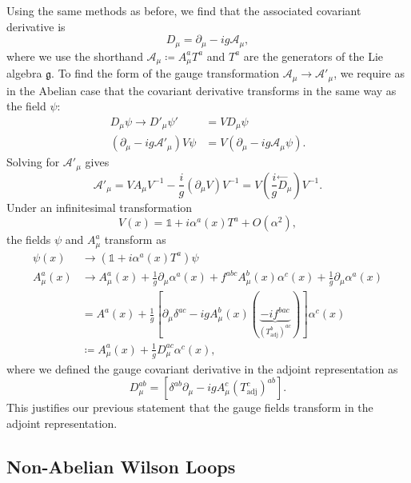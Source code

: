Using the same methods as before, we find that the associated covariant derivative is
\begin{equation}
  D_{\mu} = \partial_{\mu} - i g \mathcal{A}_{\mu},
\end{equation}
where we use the shorthand $\mathcal{A}_{\mu} \coloneqq A_{\mu}^{a} T^{a}$ and $T^{a}$ are the generators of the Lie algebra $\mathfrak{g}$.
To find the form of the gauge transformation $\mathcal{A}_{\mu} \to \mathcal{A}'_{\mu}$, we require as in the Abelian case that the covariant derivative transforms in the same way as the field $\psi$:
\begin{align}
  D_{\mu}\psi \to D'_{\mu} \psi' &= V D_{\mu} \psi \\
  (\partial_{\mu} - i g \mathcal{A}'_{\mu}) V\psi &= V(\partial_{\mu} - i g \mathcal{A}_{\mu} \psi).
\end{align}
Solving for $\mathcal{A}'_{\mu}$ gives
\begin{equation}
  \mathcal{A}'_{\mu} = V A_{\mu} V^{-1} - \frac{i}{g} (\partial_{\mu} V) V^{-1} = V \left(\frac{i}{g} \stackrel{\leftarrow}{D}_{\mu}\right) V^{-1}.
\end{equation}
Under an infinitesimal transformation
\begin{equation}
  V(x)= \mathbb{1} + i \alpha^{a}(x) T^{a} + O(\alpha^2),
\end{equation}
the fields $\psi$ and $A^{a}_{\mu}$ transform as
\begin{align}
  \psi(x) &\to (\mathbb{1} + i \alpha^{a}(x) T^{a})\psi \\
  A^{a}_{\mu}(x) &\to A^a_{\mu} (x) + \frac{1}{g} \partial_{\mu} \alpha^{a}(x) + f^{abc} A_{\mu}^{b} (x) \alpha^{c}(x) + \frac{1}{g} \partial_{\mu} \alpha^{a}(x) \\
	   &= A^{a}(x) +\frac{1}{g} [\partial_{\mu} \delta^{ac} - i g A^{b}_\mu(x) (\underbrace{-i f^{bac}}_{(T^{b}_{\text{adj}})^{ac}})] \alpha^{c}(x) \\
	   &\coloneqq A^{a}_{\mu} (x) + \frac{1}{g} D_{\mu}^{ac} \alpha^{c}(x),
\end{align}
where we defined the gauge covariant derivative in the adjoint representation as 
\begin{equation}
  D_{\mu}^{ab} = \left[ \delta^{ab} \partial_{\mu} - i g A_{\mu}^{c} (T^{c} _{\text{adj}})^{ab} \right].
\end{equation}
This justifies our previous statement that the gauge fields transform in the adjoint representation.

\subsection{Non-Abelian Wilson Loops}%
\label{sub:non_abelian_wilson_lines}

